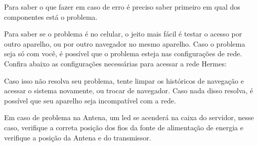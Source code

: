 \documentclass[11pt,a4paper]{article}
\begin{document}
Para saber o que fazer em caso de erro é preciso saber primeiro em qual dos componentes está o problema.



Para saber se o problema é no celular, o jeito mais fácil é testar o acesso por outro aparelho, ou por outro navegador no mesmo aparelho. Caso o problema seja só com você, é possível que o problema esteja nas configurações de rede. Confira abaixo as configurações necessárias para acessar a rede Hermes:



Caso isso não resolva seu problema, tente limpar os históricos de navegação e acessar o sistema novamente, ou trocar de navegador. Caso nada disso resolva, é possível que seu aparelho seja incompatível com a rede.



Em caso de problema na Antena, um led se acenderá na caixa do servidor, nesse caso, verifique a correta posição dos fios da fonte de alimentação de energia e verifique a posição da Antena e do transmissor.
\end{document}
